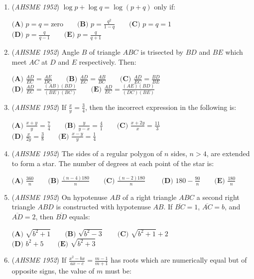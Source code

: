 \begin{enumerate}
	\item (\textit{AHSME 1952}) $\log p+\log q=\log(p+q)$ only if:


 $\textbf{(A) \ }p=q=\text{zero}  \qquad \textbf{(B) \ }p=\frac{q^2}{1-q} \qquad \textbf{(C) \ }p=q=1 \qquad$
$\textbf{(D) \ }p=\frac{q}{q-1} \qquad \textbf{(E) \ }p=\frac{q}{q+1}$


	\item (\textit{AHSME 1952}) Angle $B$ of triangle $ABC$ is trisected by $BD$ and $BE$ which meet $AC$ at $D$ and $E$ respectively. Then:


 $\textbf{(A) \ }\frac{AD}{EC}=\frac{AE}{DC}  \qquad \textbf{(B) \ }\frac{AD}{EC}=\frac{AB}{BC} \qquad \textbf{(C) \ }\frac{AD}{EC}=\frac{BD}{BE} \qquad$
$\textbf{(D) \ }\frac{AD}{EC}=\frac{(AB)(BD)}{(BE)(BC)} \qquad \textbf{(E) \ }\frac{AD}{EC}=\frac{(AE)(BD)}{(DC)(BE)}$


	\item (\textit{AHSME 1952}) If $\frac{x}{y}=\frac{3}{4}$, then the incorrect expression in the following is:


 $\textbf{(A) \ }\frac{x+y}{y}=\frac{7}{4}  \qquad \textbf{(B) \ }\frac{y}{y-x}=\frac{4}{1} \qquad \textbf{(C) \ }\frac{x+2y}{x}=\frac{11}{3} \qquad$
$\textbf{(D) \ }\frac{x}{2y}=\frac{3}{8} \qquad \textbf{(E) \ }\frac{x-y}{y}=\frac{1}{4}$


	\item (\textit{AHSME 1952}) The sides of a regular polygon of $n$ sides, $n>4$, are extended to form a star. The number of degrees at each point of the star is:


 $\textbf{(A) \ }\frac{360}{n}  \qquad \textbf{(B) \ }\frac{(n-4)180}{n} \qquad \textbf{(C) \ }\frac{(n-2)180}{n} \qquad$
$\textbf{(D) \ }180-\frac{90}{n} \qquad \textbf{(E) \ }\frac{180}{n}$


	\item (\textit{AHSME 1952}) On hypotenuse $AB$ of a right triangle $ABC$ a second right triangle $ABD$ is constructed with hypotenuse $AB$. If $\overline{BC}=1$, $\overline{AC}=b$, and $\overline{AD}=2$, then $\overline{BD}$ equals:


 $\textbf{(A) \ }\sqrt{b^2+1}  \qquad \textbf{(B) \ }\sqrt{b^2-3} \qquad \textbf{(C) \ }\sqrt{b^2+1}+2 \qquad$
$\textbf{(D) \ }b^2+5 \qquad \textbf{(E) \ }\sqrt{b^2+3}$


	\item (\textit{AHSME 1952}) If $\frac{x^2-bx}{ax-c}=\frac{m-1}{m+1}$ has roots which are numerically equal but of opposite signs, the value of $m$ must be:



\end{enumerate}
